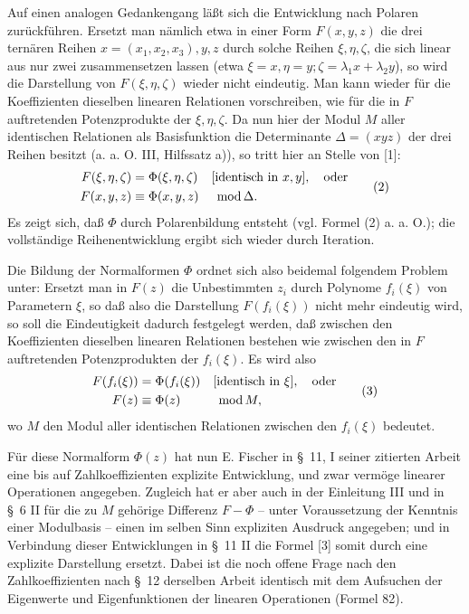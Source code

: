 \documentclass[11pt]{article}
\newcommand{\modu}[1]{\;\operatorname{mod} #1}
\providecommand{\modu}[1]{\;\operatorname{mod} #1}
\begin{document}
Auf einen analogen Gedankengang läßt sich die Entwicklung nach Polaren zurückführen. Ersetzt man nämlich etwa in einer Form $F(x,y,z)$ die drei ternären Reihen $x=(x_1,x_2,x_3),y,z$ durch solche Reihen $\xi,\eta,\zeta$, die sich linear aus nur zwei zusammensetzen lassen (etwa $\xi=x,\eta=y;\zeta=\lambda_1x+\lambda_2y$), so wird die Darstellung von $F(\xi,\eta,\zeta)$ wieder nicht eindeutig. Man kann wieder für die Koeffizienten dieselben linearen Relationen vorschreiben, wie für die in $F$ auftretenden Potenzprodukte der $\xi,\eta,\zeta$. Da nun hier der Modul $M$ aller identischen Relationen als Basisfunktion die Determinante $\Delta=(xyz)$ der drei Reihen besitzt (a. a. O. III, Hilfssatz a)), so tritt hier an Stelle von [1]:
\begin{equation}
\begin{aligned}
        F(\xi,\eta,\zeta)&=\Phi(\xi,\eta,\zeta)&&[\text{identisch in }x,y],\quad\text{oder}\notag\\
        F(x,y,z)&\equiv\Phi(x,y,z)&&\modu{\Delta}.
\end{aligned}
\tag{2}
\end{equation}
Es zeigt sich, daß $\Phi$ durch Polarenbildung entsteht (vgl. Formel (2) a. a. O.); die vollständige Reihenentwicklung ergibt sich wieder durch Iteration.

Die Bildung der Normalformen $\Phi$ ordnet sich also beidemal folgendem Problem unter: Ersetzt man in $F(z)$ die Unbestimmten $z_i$ durch Polynome $f_i(\xi)$ von Parametern $\xi$, so daß also die Darstellung $F(f_i(\xi))$ nicht mehr eindeutig wird, so soll die Eindeutigkeit dadurch festgelegt werden, daß zwischen den Koeffizienten dieselben linearen Relationen bestehen wie zwischen den in $F$ auftretenden Potenzprodukten der $f_i(\xi)$. Es wird also
\begin{equation}
\begin{aligned}
        F(f_i(\xi))&=\Phi(f_i(\xi))&&[\text{identisch in }\xi],\quad\text{oder}\notag\\
        F(z)&\equiv\Phi(z)&&\modu{M},
\end{aligned}
\tag{3}
\end{equation}
wo $M$ den Modul aller identischen Relationen zwischen den $f_i(\xi)$ bedeutet.

Für diese Normalform $\Phi(z)$ hat nun E. Fischer in \S~11, I seiner zitierten Arbeit eine bis auf Zahlkoeffizienten explizite Entwicklung, und zwar vermöge linearer Operationen angegeben. Zugleich hat er aber auch in der Einleitung III und in \S~6 II für die zu $M$ gehörige Differenz $F-\Phi$ -- unter Voraussetzung der Kenntnis einer Modulbasis -- einen im selben Sinn expliziten Ausdruck angegeben; und in Verbindung dieser Entwicklungen in \S~11 II die Formel [3] somit durch eine explizite Darstellung ersetzt. Dabei ist die noch offene Frage nach den Zahlkoeffizienten nach \S~12 derselben Arbeit identisch mit dem Aufsuchen der Eigenwerte und Eigenfunktionen der linearen Operationen (Formel 82).
\end{document}
